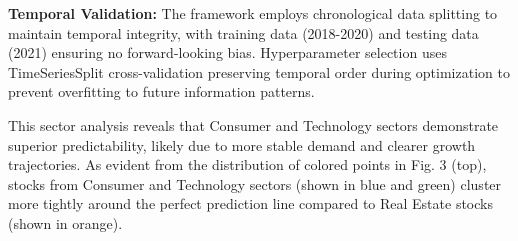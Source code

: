 \documentclass[3p,times,procedia]{elsarticle}
\begin{document}
\textbf{Temporal Validation:} The framework employs chronological data splitting to maintain temporal integrity, with training data (2018-2020) and testing data (2021) ensuring no forward-looking bias. Hyperparameter selection uses TimeSeriesSplit cross-validation preserving temporal order during optimization to prevent overfitting to future information patterns.

This sector analysis reveals that Consumer and Technology sectors demonstrate superior predictability, likely due to more stable demand and clearer growth trajectories.
As evident from the distribution of colored points in Fig. 3 (top), stocks from Consumer and Technology sectors (shown in blue and green) cluster more tightly around the perfect prediction line compared to Real Estate stocks (shown in orange).


\begin{table}[!ht]
\centering
\caption{\textbf{Market Capitalization Impact on Prediction Accuracy}}
\end{table}

\end{document}
